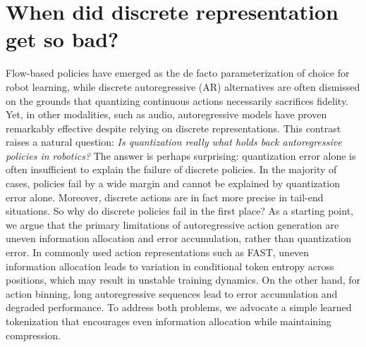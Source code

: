 \section{When did discrete representation get so bad?}

Flow-based policies have emerged as the de facto parameterization of choice for
robot learning, while discrete autoregressive (AR) alternatives are often
dismissed on the grounds that quantizing continuous actions necessarily
sacrifices fidelity. Yet, in other modalities, such as audio, autoregressive
models have proven remarkably effective despite relying on discrete
representations. This contrast raises a natural question: \emph{Is quantization
really what holds back autoregressive policies in robotics?} The answer is
perhaps surprising: quantization error alone is often insufficient to explain
the failure of discrete policies. In the majority of cases, policies fail by a
wide margin and cannot be explained by quantization error alone. Moreover,
discrete actions are in fact more precise in tail-end situations. So why do
discrete policies fail in the first place? As a starting point, we argue that
the primary limitations of autoregressive action generation are uneven
information allocation and error accumulation, rather than quantization error.
In commonly used action representations such as FAST, uneven information
allocation leads to variation in conditional token entropy across positions,
which may result in unstable training dynamics. On the other hand, for action
binning, long autoregressive sequences lead to error accumulation and degraded
performance. To address both problems, we advocate a simple learned tokenization
that encourages even information allocation while maintaining compression.
